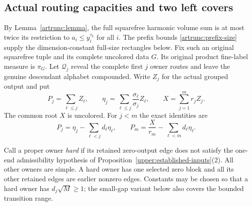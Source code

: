 \subsection{Actual routing capacities and two left covers}
\label{upper:geometry-section}

By Lemma~\ref{artrunc:lemma}, the full squarefree harmonic volume sum is
at most twice its restriction to $a_i\leq y_i^{\tau_k}$ for all $i$.
The prefix bounds \eqref{artrunc:prefix-size} supply the dimension-constant
full-size rectangles below. Fix such an original squarefree tuple and its complete
uncolored data $G$.  Its original product fine-label measure is
$\pi_G$.  Let $\mathcal Q_j$ reveal the complete first $j$ owner
routes and leave the genuine descendant alphabet compounded.
Write $Z_j$ for the actual grouped output and put
\begin{equation}
 P_j=\sum_{\ell\leq j}Z_\ell,\qquad
 \eta_j=\sum_{\ell\leq j}\frac{\sigma_\ell}{\sigma_j}Z_\ell,
 \qquad X=\sum_{j=1}^m r_j Z_j.
 \label{upper:outputs}
\end{equation}
The common root $X$ is uncolored.  For $j<m$ the exact identities are
\begin{equation}
 P_j=\eta_j-\sum_{\ell<j}d_\ell\eta_\ell,
 \qquad
 P_m=\frac{X}{r_m}-\sum_{\ell<m}d_\ell\eta_\ell.
 \label{upper:carry-identities}
\end{equation}

Call a proper owner \emph{hard} if its retained zero-output edge does
not satisfy the one-end admissibility hypothesis of
Proposition~\ref{upper:established-inputs}(2).  All other owners are
simple.  A hard owner has one selected zero block and all its other
retained edges are earlier nonzero edges.  Constants may be chosen
so that a hard owner has $d_j\sqrt M\geq1$; the small-gap variant below
also covers the bounded transition range.

